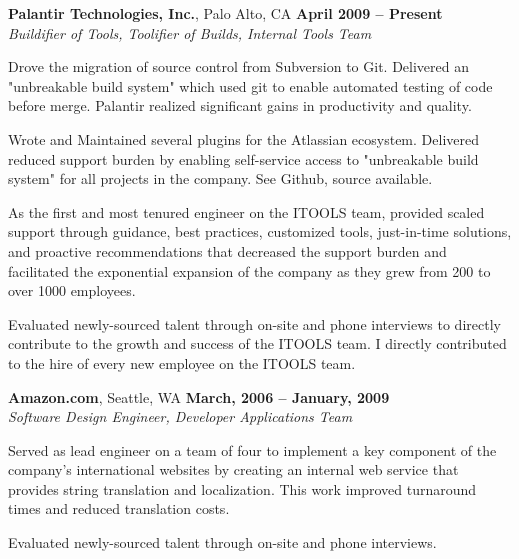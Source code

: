 \documentclass[margin,line]{resume}
\begin{document}
\begin{resume}
	{\bf Palantir Technologies, Inc.}, Palo Alto, CA   \hfill {\bf April 2009 -- Present}
	\vspace{1mm} \\ \vspace{1mm}
	{\sl Buildifier of Tools, Toolifier of Builds, Internal Tools Team} %
	\begin{list2}
		\vspace*{1mm}
	\item
		Drove the migration of source control from Subversion to Git.
		Delivered an "unbreakable build system" which used git to enable
		automated testing of code before merge.  Palantir realized significant
		gains in productivity and quality.
	\item
		Wrote and Maintained several plugins for the Atlassian ecosystem.
		Delivered reduced support burden by enabling self-service access to
		"unbreakable build system" for all projects in the company.
		See Github, source available.
	\item
		As the first and most tenured engineer on the ITOOLS team, provided
		scaled support through guidance, best practices, customized tools,
		just-in-time solutions, and proactive recommendations that decreased
		the support burden and facilitated the exponential expansion of the
		company as they grew from 200 to over 1000 employees.
	\item
		Evaluated newly-sourced talent through on-site and phone interviews to
		directly contribute to the growth and success of the ITOOLS team.  I
		directly contributed to the hire of every new employee on the ITOOLS
		team.
	\end{list2}
	{\bf Amazon.com}, Seattle, WA   \hfill {\bf March, 2006 -- January, 2009}
	\vspace{1mm} \\ \vspace{1mm}
	{\sl Software Design Engineer, Developer Applications Team} %
	\begin{list2}
		\vspace*{1mm}
	\item
		Served as lead engineer on a team of four to implement a key component
		of the company's international websites by creating an internal web
		service that provides string translation and localization.  This work
		improved turnaround times and reduced translation costs.
	\item
		Evaluated newly-sourced talent through on-site and phone interviews.
	\end{list2}


\end{resume}
\end{document}
